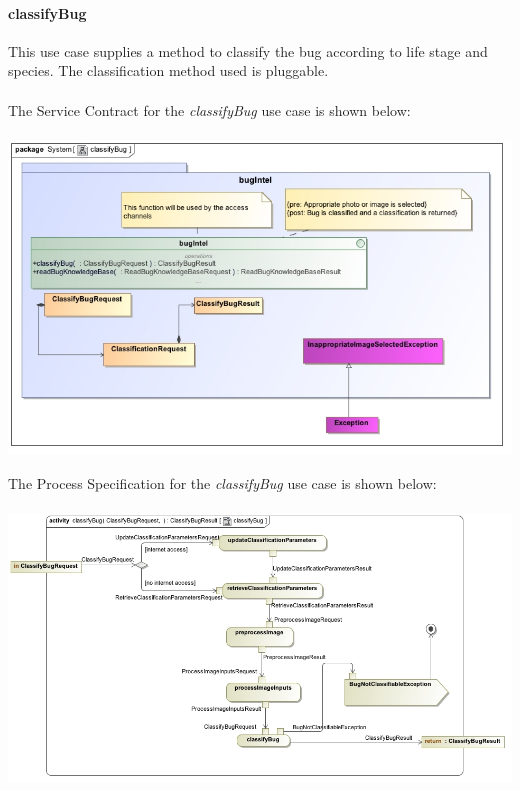 \documentclass[11pt,a4paper,titlepage]{article}
\begin{document}
		\paragraph{classifyBug }
		This use case supplies a method to classify the bug according to life stage and species. The classification method used is pluggable.\\\hfill\\
		The Service Contract for the \textit{classifyBug} use case is shown below:\\\hfill\\
		\includegraphics[width=\linewidth]{classifyBug}
		
		The Process Specification for the \textit{classifyBug} use case is shown below:\\\hfill\\
		\includegraphics[width=\linewidth]{classfyBugPS}
		
\end{document}
